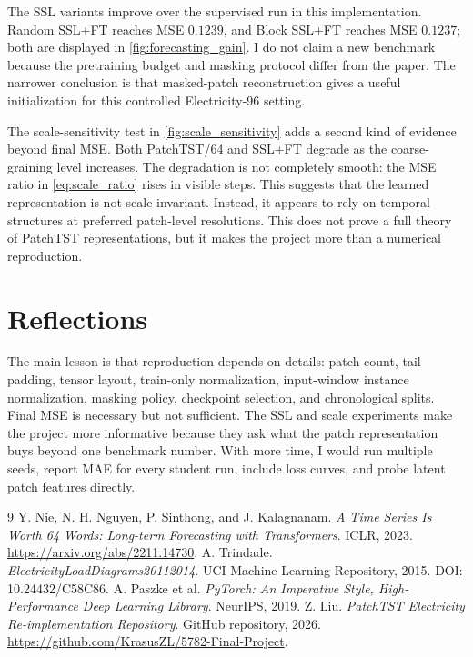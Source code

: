 \documentclass[11pt,twocolumn]{article}
\begin{document}
The SSL variants improve over the supervised run in this implementation. Random SSL+FT reaches MSE $0.1239$, and Block SSL+FT reaches MSE $0.1237$; both are displayed in \autoref{fig:forecasting_gain}. I do not claim a new benchmark because the pretraining budget and masking protocol differ from the paper. The narrower conclusion is that masked-patch reconstruction gives a useful initialization for this controlled Electricity-96 setting.

The scale-sensitivity test in \autoref{fig:scale_sensitivity} adds a second kind of evidence beyond final MSE. Both PatchTST/64 and SSL+FT degrade as the coarse-graining level increases. The degradation is not completely smooth: the MSE ratio in \eqref{eq:scale_ratio} rises in visible steps. This suggests that the learned representation is not scale-invariant. Instead, it appears to rely on temporal structures at preferred patch-level resolutions. This does not prove a full theory of PatchTST representations, but it makes the project more than a numerical reproduction.

\section{Reflections}
The main lesson is that reproduction depends on details: patch count, tail padding, tensor layout, train-only normalization, input-window instance normalization, masking policy, checkpoint selection, and chronological splits. Final MSE is necessary but not sufficient. The SSL and scale experiments make the project more informative because they ask what the patch representation buys beyond one benchmark number. With more time, I would run multiple seeds, report MAE for every student run, include loss curves, and probe latent patch features directly.

\begin{thebibliography}{9}\footnotesize
{} Y. Nie, N. H. Nguyen, P. Sinthong, and J. Kalagnanam. \textit{A Time Series Is Worth 64 Words: Long-term Forecasting with Transformers}. ICLR, 2023. \url{https://arxiv.org/abs/2211.14730}.
 A. Trindade. \textit{ElectricityLoadDiagrams20112014}. UCI Machine Learning Repository, 2015. DOI: 10.24432/C58C86.
 A. Paszke et al. \textit{PyTorch: An Imperative Style, High-Performance Deep Learning Library}. NeurIPS, 2019.
 Z. Liu. \textit{PatchTST Electricity Re-implementation Repository}. GitHub repository, 2026. \url{https://github.com/KrasusZL/5782-Final-Project}.
\end{thebibliography}
\end{document}

